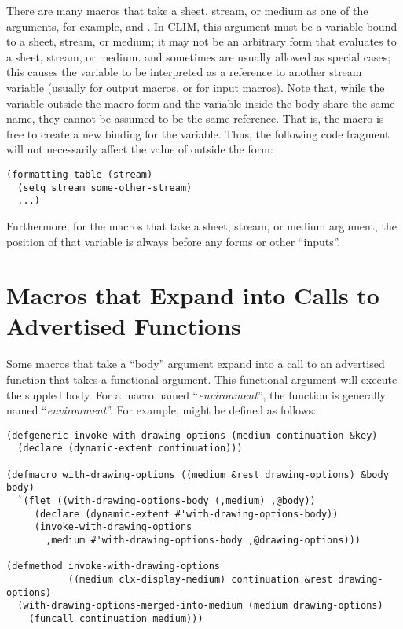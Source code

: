 There are many macros that take a sheet, stream, or medium as one of the
arguments, for example,  and .
In CLIM, this argument must be a variable bound to a sheet, stream, or medium;
it may not be an arbitrary form that evaluates to a sheet, stream, or medium.
 and sometimes  are usually allowed as special cases; this causes
the variable to be interpreted as a reference to another stream variable
(usually  for output macros, or  for input
macros).  Note that, while the variable outside the macro form and the variable
inside the body share the same name, they cannot be assumed to be the same
reference.  That is, the macro is free to create a new binding for the variable.
Thus, the following code fragment will not necessarily affect the value of
 outside the  form:

\begin{verbatim}
(formatting-table (stream)
  (setq stream some-other-stream)
  ...)
\end{verbatim}

Furthermore, for the macros that take a sheet, stream, or medium argument, the
position of that variable is always before any forms or other ``inputs''.


\section {Macros that Expand into Calls to Advertised Functions}

Some macros that take a ``body'' argument expand into a call to an advertised
function that takes a functional argument.  This functional argument will
execute the suppled body.  For a macro named ``{\it {}environment}'',
the function is generally named ``{\it {}environment}''.  For
example,  might be defined as follows:

\begin{verbatim}
(defgeneric invoke-with-drawing-options (medium continuation &key)
  (declare (dynamic-extent continuation)))

(defmacro with-drawing-options ((medium &rest drawing-options) &body body)
  `(flet ((with-drawing-options-body (,medium) ,@body))
     (declare (dynamic-extent #'with-drawing-options-body))
     (invoke-with-drawing-options
       ,medium #'with-drawing-options-body ,@drawing-options)))

(defmethod invoke-with-drawing-options 
           ((medium clx-display-medium) continuation &rest drawing-options)
  (with-drawing-options-merged-into-medium (medium drawing-options)
    (funcall continuation medium)))
\end{verbatim}


